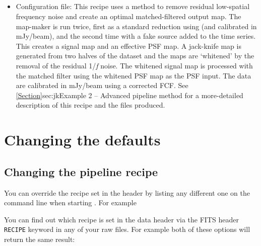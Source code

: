 \documentclass[11pt,oneside,chapters]{starlink}
\begin{document}
\subsection{}
\begin{itemize}
\item Configuration file: 
\newline\newline
This recipe uses a
method to remove residual low-spatial
frequency noise and create an optimal matched-filtered output map. The
map-maker is run twice, first as a standard reduction using
 (and calibrated in mJy/beam), and the
second time with a fake
source added to the time series. This creates a signal map and an
effective PSF map. A jack-knife map is generated from two halves of
the dataset and the maps are `whitened' by the removal of the residual
1/\emph{f} noise. The whitened signal map is processed with the
matched filter using the whitened PSF map as the PSF input. The data
are calibrated in mJy/beam using a corrected FCF.
See \cref{Section}{sec:jk}{Example 2 -- Advanced pipeline method} for a
more-detailed description of this recipe and the files produced.
\end{itemize}

\section{Changing the defaults}
\label{sec:parameterfile}
\subsection{Changing the pipeline recipe}
You can override the recipe set in the header by listing any different
one on the command line when starting \oracdr. For example
\begin{terminalv}
\end{terminalv}

You can find out which recipe is set in the data header via the FITS
header \texttt{RECIPE} keyword in any of your raw files.  For
example both of these options will return the same result:
\begin{terminalv}
\end{terminalv}
\end{document}
